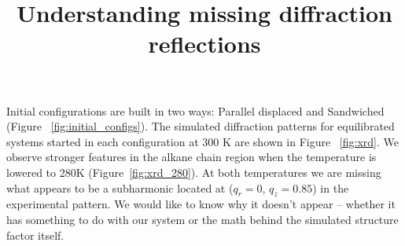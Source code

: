 \documentclass{article}
\title{Understanding missing diffraction reflections}
\begin{document}
\graphicspath{{./figures/}}  %
\maketitle

Initial configurations are built in two ways: Parallel displaced and Sandwiched
(Figure ~\ref{fig:initial_configs}).  The simulated diffraction patterns for
equilibrated systems started in each configuration at 300 K are shown in Figure
~\ref{fig:xrd}. We observe stronger features in the alkane chain region when
the temperature is lowered to 280K (Figure~\ref{fig:xrd_280}). At both
temperatures we are missing what appears to be a subharmonic located at
($q_r=0$, $q_z=0.85$) in the experimental pattern. We would like to know 
why it doesn't appear -- whether it has something to do with our system
or the math behind the simulated structure factor itself. 
\end{document}
